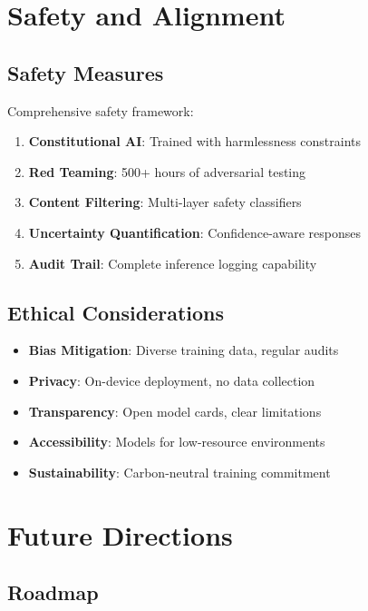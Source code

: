 \documentclass[11pt,a4paper]{article}
\begin{document}
\section{Safety and Alignment}

\subsection{Safety Measures}

Comprehensive safety framework:
\begin{enumerate}
    \item \textbf{Constitutional AI}: Trained with harmlessness constraints
    \item \textbf{Red Teaming}: 500+ hours of adversarial testing
    \item \textbf{Content Filtering}: Multi-layer safety classifiers
    \item \textbf{Uncertainty Quantification}: Confidence-aware responses
    \item \textbf{Audit Trail}: Complete inference logging capability
\end{enumerate}

\subsection{Ethical Considerations}

\begin{itemize}
    \item \textbf{Bias Mitigation}: Diverse training data, regular audits
    \item \textbf{Privacy}: On-device deployment, no data collection
    \item \textbf{Transparency}: Open model cards, clear limitations
    \item \textbf{Accessibility}: Models for low-resource environments
    \item \textbf{Sustainability}: Carbon-neutral training commitment
\end{itemize}

\section{Future Directions}

\subsection{Roadmap}
\end{document}
